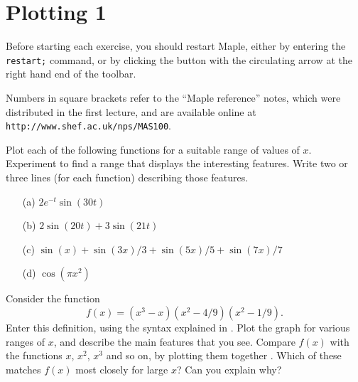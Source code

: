 \documentclass[a4paper,10pt]{amsbook}
\numberwithin{example}{chapter}
\begin{document}
\chapter{Plotting 1}

Before starting each exercise, you should restart Maple, either by
entering the \verb~restart;~ command, or by clicking the button with
the circulating arrow at the right hand end of the toolbar.

Numbers in square brackets refer to the ``Maple
reference'' notes, which were distributed in the first lecture, and
are available online at \verb~http://www.shef.ac.uk/nps/MAS100~.


\begin{exercise}\label{ex-plot-misc}
 Plot each of the following functions \note{\NOTEbasicplot}
 for a suitable range of values of $x$.  Experiment to find
 a range that displays the interesting features.  Write two
 or three lines (for each function) describing those
 features.
 \begin{itemize}
  \item[(a)] $2e^{-t}\sin(30 t)$ 
  \item[(b)] $2\sin(20 t)+3\sin(21 t)$
  \item[(c)] $\sin(x)+\sin(3x)/3+\sin(5x)/5+\sin(7x)/7$
  \item[(d)] $\cos(\pi x^2)$
 \end{itemize}
\end{exercise}

\begin{exercise}\label{ex-wiggle}
 Consider the function 
 \[ f(x) = (x^3-x)(x^2-4/9)(x^2-1/9). \] Enter this
 definition, using the syntax explained in
 \note{\NOTEarrow}.  Plot the graph for various ranges of
 $x$, and describe the main features that you see.  Compare
 $f(x)$ with the functions $x$, $x^2$, $x^3$ and so on, by
 plotting them together \note{\NOTEtwoplots}.  Which of
 these matches $f(x)$ most closely for large $x$?  Can you
 explain why?  
\end{exercise}
\end{document}
